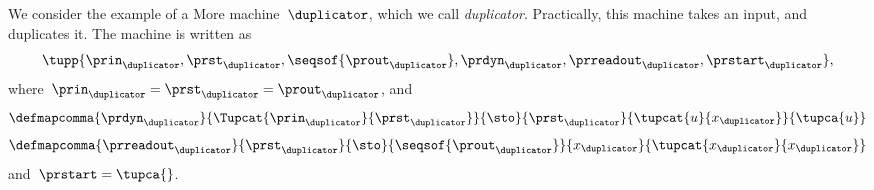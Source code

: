     
        \begin{example}[Duplicator]
            We consider the example of a More machine~$\duplicator$, which we call \emph{duplicator}.
            Practically, this machine takes an input, and duplicates it.
            The machine is written as
            \begin{equation*}
                \tupp{\prin_{\duplicator},\prst_{\duplicator},\seqsof{\prout_{\duplicator}},\prdyn_{\duplicator},\prreadout_{\duplicator},\prstart_{\duplicator}},
            \end{equation*}
            where~$\prin_{\duplicator}=\prst_{\duplicator}=\prout_\duplicator$, and
            \begin{equation*}
                \defmapcomma{\prdyn_\duplicator}
                {\Tupcat{\prin_\duplicator}{\prst_\duplicator}}
                {\sto}
                {\prst_\duplicator}
                {\tupcat{u}{x_\duplicator}}
                {\tupca{u}}
            \end{equation*}
            \begin{equation*}
                \defmapcomma{\prreadout_\duplicator}
                {\prst_\duplicator}
                {\sto}
                {\seqsof{\prout_\duplicator}}
                {x_\duplicator}
                {\tupcat{x_\duplicator}{x_\duplicator}}
            \end{equation*}
            and~$\prstart=\tupca{}$.
        \end{example}

